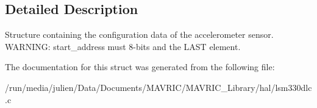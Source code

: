 \subsection{Detailed Description}
Structure containing the configuration data of the accelerometer sensor. W\+A\+R\+N\+I\+N\+G\+: start\+\_\+address must 8-\/bits and the L\+A\+S\+T element. 

The documentation for this struct was generated from the following file\+:\begin{DoxyCompactItemize}
\item 
/run/media/julien/\+Data/\+Documents/\+M\+A\+V\+R\+I\+C/\+M\+A\+V\+R\+I\+C\+\_\+\+Library/hal/lsm330dlc.\+c\end{DoxyCompactItemize}
